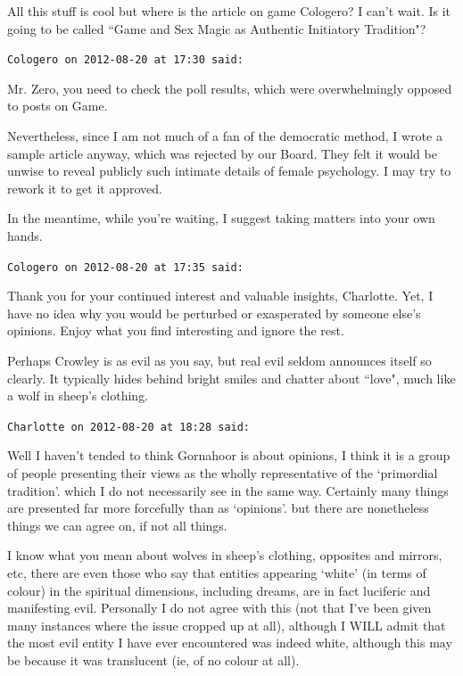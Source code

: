 \begin{footnotesize}
\begin{sffamily}
All this stuff is cool but where is the article on game Cologero? I can't wait. Is it going to be called ``Game and Sex Magic as Authentic Initiatory Tradition"?


\hfill

\texttt{Cologero on 2012-08-20 at 17:30 said: }

Mr. Zero, you need to check the poll results, which were overwhelmingly opposed to posts on Game.

Nevertheless, since I am not much of a fan of the democratic method, I wrote a sample article anyway, which was rejected by our Board. They felt it would be unwise to reveal publicly such intimate details of female psychology. I may try to rework it to get it approved.

In the meantime, while you're waiting, I suggest taking matters into your own hands.


\hfill

\texttt{Cologero on 2012-08-20 at 17:35 said: }

Thank you for your continued interest and valuable insights, Charlotte. Yet, I have no idea why you would be perturbed or exasperated by someone else's opinions. Enjoy what you find interesting and ignore the rest.

Perhaps Crowley is as evil as you say, but real evil seldom announces itself so clearly. It typically hides behind bright smiles and chatter about ``love", much like a wolf in sheep's clothing.


\hfill

\texttt{Charlotte on 2012-08-20 at 18:28 said: }

Well I haven't tended to think Gornahoor is about opinions, I think it is a group of people presenting their views as the wholly representative of the `primordial tradition'. which I do not necessarily see in the same way. Certainly many things are presented far more forcefully than as `opinions'. but there are nonetheless things we can agree on, if not all things. 

I know what you mean about wolves in sheep's clothing, opposites and mirrors, etc, there are even those who say that entities appearing `white' (in terms of colour) in the spiritual dimensions, including dreams, are in fact luciferic and manifesting evil. Personally I do not agree with this (not that I've been given many instances where the issue cropped up at all), although I WILL admit that the most evil entity I have ever encountered was indeed white, although this may be because it was translucent (ie, of no colour at all). 


\end{sffamily}
\end{footnotesize}
